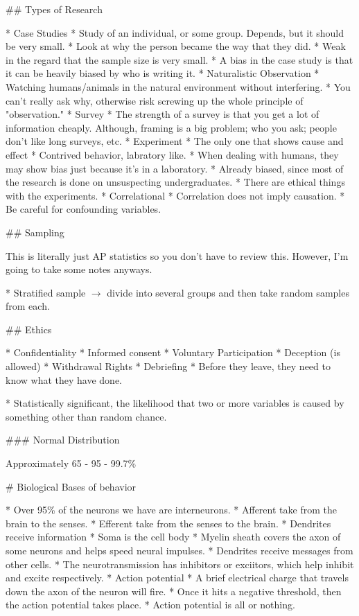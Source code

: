 \documentclass{article}
\begin{document}
\begin{markdown}
## Types of Research

* Case Studies
	* Study of an individual, or some group. Depends, but it should be very small.
	* Look at why the person became the way that they did.
	* Weak in the regard that the sample size is very small.
	* A bias in the case study is that it can be heavily biased by who is writing it.
* Naturalistic Observation
	* Watching humans/animals in the natural environment without interfering.
	* You can't really ask why, otherwise risk screwing up the whole principle of "observation."
* Survey
	* The strength of a survey is that you get a lot of information cheaply. Although, framing is a big problem; who you ask; people don't like long surveys, etc.
* Experiment
	* The only one that shows cause and effect
	* Contrived behavior, labratory like.
	* When dealing with humans, they may show bias just because it's in a laboratory.
	* Already biased, since most of the research is done on unsuspecting undergraduates.
	* There are ethical things with the experiments.
* Correlational
	* Correlation does not imply causation.
	* Be careful for confounding variables.

## Sampling

This is literally just AP statistics so you don't have to review this. However, I'm going to take some notes anyways.

* Stratified sample $\rightarrow$ divide into several groups and then take random samples from each.

## Ethics

* Confidentiality
* Informed consent
* Voluntary Participation
* Deception (is allowed)
* Withdrawal Rights
* Debriefing
	* Before they leave, they need to know what they have done.

* Statistically significant, the likelihood that two or more variables is caused by something other than random chance.

### Normal Distribution

Approximately 65 - 95 - 99.7\%

# Biological Bases of behavior

* Over 95\% of the neurons we have are interneurons.
* Afferent take from the brain to the senses.
* Efferent take from the senses to the brain.
* Dendrites receive information
* Soma is the cell body
* Myelin sheath covers the axon of some neurons and helps speed neural impulses.
* Dendrites receive messages from other cells.
* The neurotransmission has inhibitors or exciitors, which help inhibit and excite respectively.
* Action potential
	* A brief electrical charge that travels down the axon of the neuron will fire.
	* Once it hits a negative threshold, then the action potential takes place.
	* Action potential is all or nothing.


\end{markdown}
\end{document}
